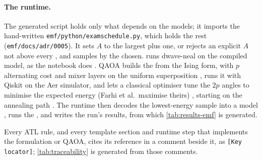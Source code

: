 \paragraph{The runtime.} The generated script holds only what depends on the models; it imports the
hand-written \texttt{emf/python/examschedule.py}, which holds the rest (\texttt{emf/docs/adr/0005}). It sets
$A$ to the largest  plus one, or rejects an explicit $A$ not above every 
\cite[§4, Comment on the Scalar Penalty P]{Glover}, and samples by the  chosen. 
runs dwave-neal on the compiled model, as the notebook does \cite[cell 15]{Notebook}. QAOA \cite{Farhi}
builds the  from the Ising form, with $p$ alternating cost and mixer layers on the uniform
superposition \cite[Eqs. (2)--(6)]{Farhi}, runs it with Qiskit \cite{Qiskit} on the Aer simulator, and lets a classical
optimiser tune the $2p$ angles to minimise the expected energy (Farhi et al.\ maximise theirs)
\cite[Eqs. (7)--(8)]{Farhi}, starting on the annealing path \cite[§VI]{Farhi}. The runtime then decodes
the lowest-energy sample into a  model \cite[§5.5]{Paper}, runs the , and writes the run's
results, from which \cref{tab:results-emf} is generated.

Every ATL rule, and every template section and runtime step that implements the formulation or QAOA, cites
its reference in a comment beside it, as
\texttt{[Key locator]}; \cref{tab:traceability} is generated from those comments.
